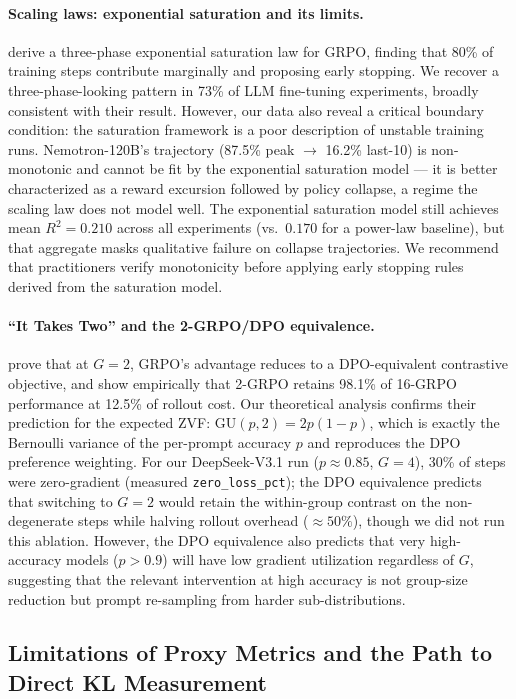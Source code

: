 \documentclass{article}
\begin{document}
\paragraph{Scaling laws: exponential saturation and its limits.}
\citet{nimmaturi2025predictive} derive a three-phase exponential saturation
law for GRPO, finding that 80\% of training steps contribute marginally and
proposing early stopping.
We recover a three-phase-looking pattern in 73\% of LLM fine-tuning
experiments, broadly consistent with their result.
However, our data also reveal a critical boundary condition: the saturation
framework is a poor description of unstable training runs.
Nemotron-120B's trajectory (87.5\% peak $\to$ 16.2\% last-10) is
non-monotonic and cannot be fit by the exponential saturation model ---
it is better characterized as a reward excursion followed by policy
collapse, a regime the scaling law does not model well. The exponential
saturation model still achieves mean $R^{2} = 0.210$ across all experiments
(vs.\ $0.170$ for a power-law baseline), but that aggregate masks qualitative
failure on collapse trajectories.
We recommend that practitioners verify monotonicity before applying early
stopping rules derived from the saturation model.

\paragraph{``It Takes Two'' and the 2-GRPO/DPO equivalence.}
\citet{wu2025grpo_dpo} prove that at $G = 2$, GRPO's advantage reduces to a
DPO-equivalent contrastive objective, and show empirically that 2-GRPO retains
98.1\% of 16-GRPO performance at 12.5\% of rollout cost.
Our theoretical analysis confirms their prediction for the expected ZVF:
$\mathrm{GU}(p, 2) = 2p(1-p)$, which is exactly the Bernoulli variance of
the per-prompt accuracy $p$ and reproduces the DPO preference weighting.
For our DeepSeek-V3.1 run ($p \approx 0.85$, $G = 4$), 30\% of steps were
zero-gradient (measured \texttt{zero\_loss\_pct}); the DPO equivalence predicts
that switching to $G = 2$ would retain the within-group contrast on the
non-degenerate steps while halving rollout overhead ($\approx 50\%$), though we
did not run this ablation.
However, the DPO equivalence also predicts that very high-accuracy models
($p > 0.9$) will have low gradient utilization regardless of $G$, suggesting
that the relevant intervention at high accuracy is not group-size reduction
but prompt re-sampling from harder sub-distributions.

\subsection{Limitations of Proxy Metrics and the Path to Direct KL Measurement}
\label{sec:discuss_kl}
\end{document}

